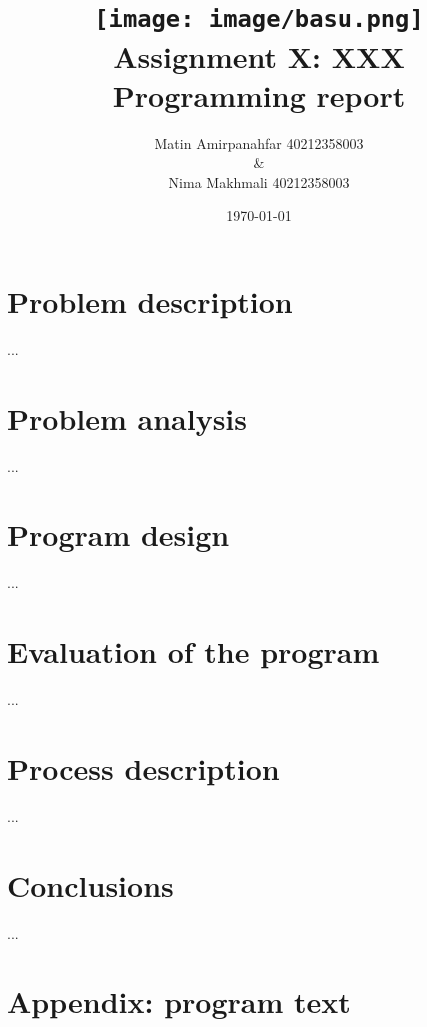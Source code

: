 \documentclass[a4paper]{article}
\title{\texttt{[image: image/basu.png]} \\
  Assignment X: XXX \\ Programming report}
\author{Matin Amirpanahfar 40212358003 \\ \& \\ Nima Makhmali 40212358003}
\date{\today}
\begin{document}
\maketitle


\section{Problem description}

...

\section{Problem analysis}

...

\section{Program design}

...

\section{Evaluation of the program}

...

%

\section{Process description}

...

\section{Conclusions}

...

\section{Appendix: program text}


% 

%

%
\end{document}
